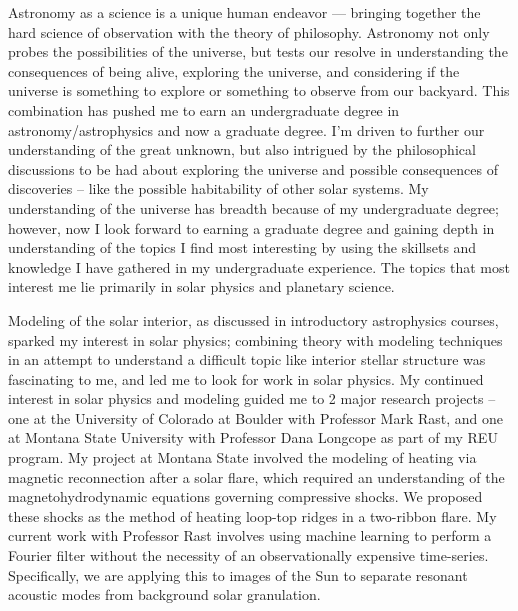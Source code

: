 \documentclass[11pt,letterpaper]{article}
\begin{document}
Astronomy as a science is a unique human endeavor — bringing together the hard science of observation with the theory of philosophy. Astronomy not only probes the possibilities of the universe, but tests our resolve in understanding the consequences of being alive, exploring the universe, and considering if the universe is something to explore or something to observe from our backyard. This combination has pushed me to earn an undergraduate degree in astronomy/astrophysics and now a graduate degree. I’m driven to further our understanding of the great unknown, but also intrigued by the philosophical discussions to be had about exploring the universe and possible consequences of discoveries -- like the possible habitability of other solar systems. My understanding of the universe has breadth because of my undergraduate degree; however, now I look forward to earning a graduate degree and gaining depth in understanding of the topics I find most interesting by using the skillsets and knowledge I have gathered in my undergraduate experience. The topics that most interest me lie primarily in solar physics and planetary science. 
 
Modeling of the solar interior, as discussed in introductory astrophysics courses, sparked my interest in solar physics; combining theory with modeling techniques in an attempt to understand a difficult topic like interior stellar structure was fascinating to me, and led me to look for work in solar physics. My continued interest in solar physics and modeling guided me to 2 major research projects -- one at the University of Colorado at Boulder with Professor Mark Rast, and one at Montana State University with Professor Dana Longcope as part of my REU program. My project at Montana State involved the modeling of heating via magnetic reconnection after a solar flare, which required an understanding of the magnetohydrodynamic equations governing compressive shocks. We proposed these shocks as the method of heating loop-top ridges in a two-ribbon flare. My current work with Professor Rast involves using machine learning to perform a Fourier filter without the necessity of an observationally expensive time-series. Specifically, we are applying this to images of the Sun to separate resonant acoustic modes from background solar granulation.
\end{document}
